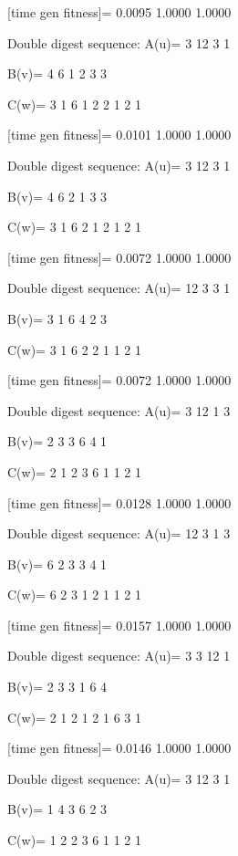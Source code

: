 [time gen fitness]=
    0.0095    1.0000    1.0000

Double digest sequence:
A(u)=
     3    12     3     1

B(v)=
     4     6     1     2     3     3

C(w)=
     3     1     6     1     2     2     1     2     1

[time gen fitness]=
    0.0101    1.0000    1.0000

Double digest sequence:
A(u)=
     3    12     3     1

B(v)=
     4     6     2     1     3     3

C(w)=
     3     1     6     2     1     2     1     2     1

[time gen fitness]=
    0.0072    1.0000    1.0000

Double digest sequence:
A(u)=
    12     3     3     1

B(v)=
     3     1     6     4     2     3

C(w)=
     3     1     6     2     2     1     1     2     1

[time gen fitness]=
    0.0072    1.0000    1.0000

Double digest sequence:
A(u)=
     3    12     1     3

B(v)=
     2     3     3     6     4     1

C(w)=
     2     1     2     3     6     1     1     2     1

[time gen fitness]=
    0.0128    1.0000    1.0000

Double digest sequence:
A(u)=
    12     3     1     3

B(v)=
     6     2     3     3     4     1

C(w)=
     6     2     3     1     2     1     1     2     1

[time gen fitness]=
    0.0157    1.0000    1.0000

Double digest sequence:
A(u)=
     3     3    12     1

B(v)=
     2     3     3     1     6     4

C(w)=
     2     1     2     1     2     1     6     3     1

[time gen fitness]=
    0.0146    1.0000    1.0000

Double digest sequence:
A(u)=
     3    12     3     1

B(v)=
     1     4     3     6     2     3

C(w)=
     1     2     2     3     6     1     1     2     1

